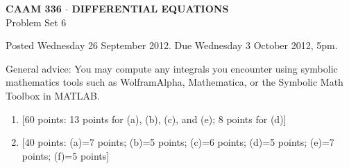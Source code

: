\documentclass[10pt]{article}
\begin{document}

\begin{center}
\large \textsf{\textbf{CAAM 336 $\cdot$ DIFFERENTIAL EQUATIONS}\\[0.5em]
 Problem Set 6 }
\end{center}

Posted Wednesday 26 September 2012.  Due Wednesday 3 October 2012, 5pm.



General advice: You may compute any integrals you encounter using symbolic mathematics 
tools such as WolframAlpha, Mathematica, or the Symbolic Math Toolbox in MATLAB.


\begin{enumerate}
\item {[60 points: 13 points for (a), (b), (c), and (e); 8 points for (d)]}\\  


\vspace*{1em}
\item {[40 points: (a)=7 points; (b)=5 points; (c)=6 points; (d)=5 points; (e)=7 points; (f)=5 points]}\\


\end{enumerate}
\end{document}
